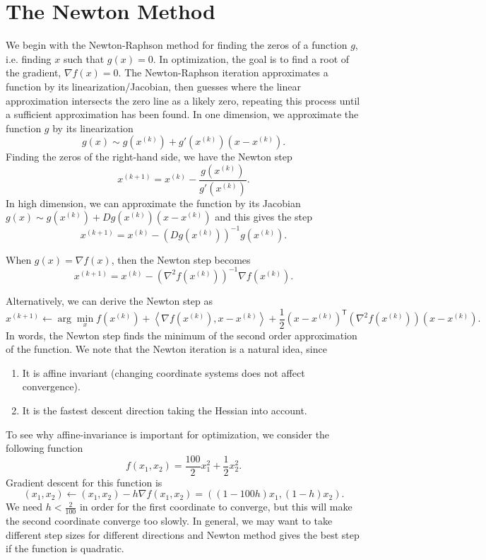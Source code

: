 
\section{The Newton Method\label{sec:Newton-Method}}

We begin with the Newton-Raphson method for finding the zeros of a
function $g$, i.e. finding $x$ such that $g(x)=0$. In optimization,
the goal is to find a root of the gradient, $\nabla f(x)=0$. The
Newton-Raphson iteration approximates a function by its linearization/Jacobian,
then guesses where the linear approximation intersects the zero line
as a likely zero, repeating this process until a sufficient approximation
has been found. In one dimension, we approximate the function $g$
by its linearization 
\[
g(x)\sim g(x^{(k)})+g'(x^{(k)})(x-x^{(k)}).
\]
Finding the zeros of the right-hand side, we have the Newton step
\[
x^{(k+1)}=x^{(k)}-\frac{g(x^{(k)})}{g'(x^{(k)})}.
\]
In high dimension, we can approximate the function by its Jacobian
$g(x)\sim g(x^{(k)})+Dg(x^{(k)})(x-x^{(k)})$ and this gives the step
\[
x^{(k+1)}=x^{(k)}-\left(Dg(x^{(k)})\right)^{-1}g(x^{(k)}).
\]

When $g(x)=\nabla f(x)$, then the Newton step becomes
\[
x^{(k+1)}=x^{(k)}-\left(\nabla^{2}f(x^{(k)})\right)^{-1}\nabla f(x^{(k)}).
\]

Alternatively, we can derive the Newton step as 
\[
x^{(k+1)}\leftarrow\arg\min_{x}f(x^{(k)})+\left\langle \nabla f(x^{(k)}),x-x^{(k)}\right\rangle +\frac{1}{2}(x-x^{(k)})^{\mathsf{T}}(\nabla^{2}f(x^{(k)}))(x-x^{(k)}).
\]
In words, the Newton step finds the minimum of the second order approximation
of the function. We note that the Newton iteration is a natural idea,
since
\begin{enumerate}
\item It is affine invariant (changing coordinate systems does not affect
convergence).
\item It is the fastest descent direction taking the Hessian into account.
\end{enumerate}
%
To see why affine-invariance is important for optimization, we consider
the following function
\[
f(x_{1},x_{2})=\frac{100}{2}x^{2}_{1}+\frac{1}{2}x^{2}_{2}.
\]
Gradient descent for this function is
\[
(x_{1},x_{2})\leftarrow(x_{1},x_{2})-h\nabla f(x_{1},x_{2})=((1-100h)x_{1},(1-h)x_{2}).
\]
We need $h<\frac{2}{100}$ in order for the first coordinate to converge,
but this will make the second coordinate converge too slowly. In general,
we may want to take different step sizes for different directions
and Newton method gives the best step if the function is quadratic.

